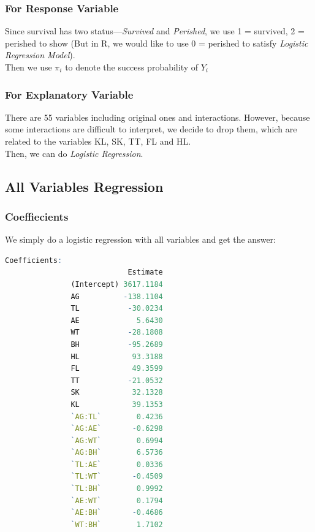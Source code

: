 \documentclass[12pt,a4paper]{article}
\begin{document}
\subsubsection{For Response Variable}
Since survival has two status---\emph{Survived} and \emph{Perished}, we use 1 = survived, 2 = perished to show (But in R, we would like to use 0 = perished to satisfy \emph{Logistic Regression Model}).\\ 
\newline
Then we use $\pi_i$ to denote the success probability of $Y_i$ 
\subsubsection{For Explanatory Variable}
There are 55 variables including original ones and interactions. However, because some interactions are dif{}ficult to interpret, we decide to drop them, which are related to the variables KL, SK, TT, FL and HL.\\
\newline
Then, we can do \emph{Logistic Regression}.
\subsection{All Variables Regression}
\subsubsection{Coeffiecients}
We simply do a logistic regression with all variables and get the answer:
\begin{lstlisting}[language = R]
          Coefficients:
                            Estimate 
               (Intercept) 3617.1184
               AG          -138.1104  
               TL           -30.0234
               AE             5.6430 
               WT           -28.1808  
               BH           -95.2689  
               HL            93.3188    
               FL            49.3599   
               TT           -21.0532    
               SK            32.1328   
               KL            39.1353 
               `AG:TL`        0.4236   
               `AG:AE`       -0.6298   
               `AG:WT`        0.6994 
               `AG:BH`        6.5736  
               `TL:AE`        0.0336   
               `TL:WT`       -0.4509    
               `TL:BH`        0.9992    
               `AE:WT`        0.1794    
               `AE:BH`       -0.4686    
               `WT:BH`        1.7102  
\end{lstlisting}
\end{document}
